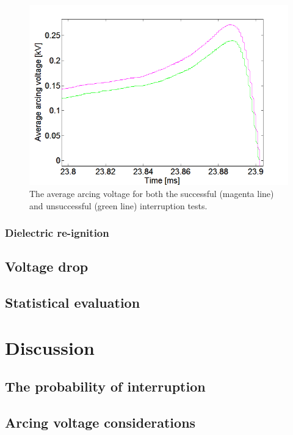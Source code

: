 \documentclass[10pt,b5paper,twoside]{article}
\begin{document}
\begin{figure}[H]
\centering
\includegraphics[scale=0.6, angle =0 ]{Bilder/Results/ArcingVoltage_18_both_average.png}
\caption{The average arcing voltage for both the successful (magenta line) and unsuccessful (green line) interruption tests.} \label{fig:18mm_both_ave}
\end{figure}

\subsubsection{Dielectric re-ignition} \label{sec:dielectricReIgnitionResults}


\newpage
\subsection{Voltage drop} \label{sec:durability}

\newpage
\subsection{Statistical evaluation}

\cleardoublepage

\section{Discussion}
\subsection{The probability of interruption} 


\subsection{Arcing voltage considerations}
 
\end{document}
